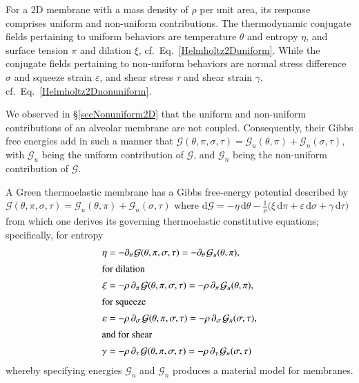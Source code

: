 For a 2D membrane with a mass density of $\rho$ per unit area, its response comprises uniform and non-uniform contributions.  The thermo\-dynamic conjugate fields pertaining to uniform behaviors are temperature $\theta$ and entropy $\eta$, and surface tension $\pi$ and dilation $\xi$, cf.\ Eq.~\ref{Helmholtz2Duniform}.  While the conjugate fields pertaining to non-uniform behaviors are normal stress difference $\sigma$ and squeeze strain $\varepsilon$, and shear stress $\tau$ and shear strain $\gamma$, cf.\ Eq.~\ref{Helmholtz2Dnonuniform}.

We observed in \S\ref{secNonuniform2D} that the uniform and non-uniform contributions of an alveolar membrane are not coupled.  Consequently, their Gibbs free energies add in such a manner that $\mathcal{G} (\theta , \pi , \sigma , \tau ) = \mathcal{G}_u (\theta , \pi ) + \mathcal{G}_n (\sigma , \tau)$, with $\mathcal{G}_u$ being the uniform contribution of $\mathcal{G}$, and $\mathcal{G}_n$ being the non-uniform contribution of $\mathcal{G}$.

A Green thermo\-elastic membrane has a Gibbs free-energy potential described by $\mathcal{G} ( \theta , \pi , \sigma , \tau ) = \mathcal{G}_u (\theta , \pi ) + \mathcal{G}_n (\sigma , \tau)$ where $\mathrm{d} \mathcal{G} = -\eta \, \mathrm{d} \theta - \tfrac{1}{\rho} \bigl( \xi \, \mathrm{d} \pi + \varepsilon \, \mathrm{d} \sigma + \gamma \, \mathrm{d} \tau \bigr)$ from which one derives its governing thermo\-elastic constitutive equations; specifically, for entropy
\begin{subequations}
    \label{membraneCEs}
    \begin{align}
    \eta & = - \partial_{\theta\,} \mathcal{G}
    ( \theta , \pi , \sigma , \tau ) = 
    - \partial_{\theta\,} \mathcal{G}_u
    ( \theta , \pi ) ,
    \label{membraneEntropy} \\
    \intertext{for dilation}
    \xi & = -\rho \, \partial_{\pi\,} \mathcal{G}
    ( \theta , \pi , \sigma , \tau ) = 
    -\rho \, \partial_{\pi\,} \mathcal{G}_u
    ( \theta , \pi )  ,
    \label{membraneDilation} \\
    \intertext{for squeeze}
    \varepsilon & = -\rho \, 
    \partial_{\sigma\,} \mathcal{G}
    ( \theta , \pi , \sigma , \tau ) = 
    -\rho \, \partial_{\sigma\,} \mathcal{G}_n
    ( \sigma , \tau ) ,
    \label{membraneSqueeze} \\
    \intertext{and for shear}
    \gamma & = - \rho \,
    \partial_{\tau\,} \mathcal{G}
    ( \theta , \pi , \sigma , \tau ) = 
    - \rho \, \partial_{\tau\,} \mathcal{G}_n
    ( \sigma , \tau ) 
    \label{membraneShear} 
    \end{align}
\end{subequations}
whereby specifying energies $\mathcal{G}_u$ and $\mathcal{G}_n$ produces a material model for membranes.

